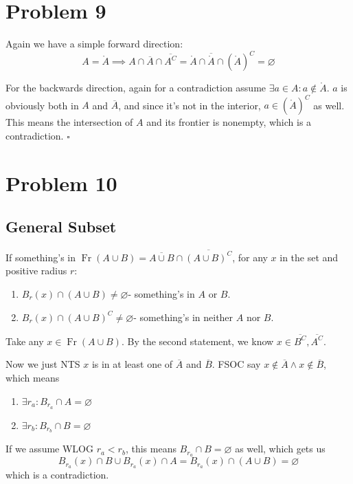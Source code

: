 \documentclass[12pt]{article}
\DeclareMathOperator{\Fr}{Fr}
\begin{document}
\section{Problem 9}

Again we have a simple forward direction:
\[A=\mathring{A}
\implies A \cap \overline{A} \cap \overline{A^C}
=\mathring{A} \cap \overline{\mathring{A}} \cap \left(\mathring{A}\right)^C
=\varnothing\]

For the backwards direction, again for a contradiction assume $\exists a \in A: a \notin \mathring{A}$.
$a$ is obviously both in $A$ and $\overline{A}$, and since it's not in the interior, $a \in \left(\mathring{A}\right)^C$ as well.
This means the intersection of $A$ and its frontier is nonempty, which is a contradiction. $\square$

\pagebreak

\section{Problem 10}

\subsection{General Subset}

If something's in $\Fr(A \cup B)=\overline{A \cup B} \cap \overline{(A \cup B)^C}$,
for any $x$ in the set and positive radius $r$:
\begin{enumerate}
    \item $B_r(x) \cap (A \cup B) \ne \varnothing$- something's in $A$ or $B$.
    \item $B_r(x) \cap (A \cup B)^C \ne \varnothing$- something's in neither $A$ nor $B$.
\end{enumerate}

Take any $x \in \Fr(A \cup B)$.
By the second statement, we know $x \in \overline{B^C}, \overline{A^C}$.

Now we just NTS $x$ is in at least one of $\overline{A}$ and $\overline{B}$.
FSOC say $x \notin \overline{A} \land x \notin \overline{B}$, which means
\begin{enumerate}
    \item $\exists r_a: B_{r_a} \cap A = \varnothing$
    \item $\exists r_b: B_{r_b} \cap B = \varnothing$
\end{enumerate}
If we assume WLOG $r_a < r_b$, this means $B_{r_a} \cap B = \varnothing$ as well,
which gets us
\[B_{r_a}(x) \cap B \cup B_{r_a}(x) \cap A = B_{r_a}(x) \cap (A \cup B) = \varnothing\]
which is a contradiction.
\end{document}
